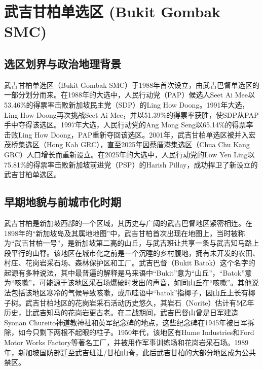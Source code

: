 \documentclass[11pt,a4paper,twoside,openany]{book}
\begin{document}
\chapter{武吉甘柏单选区 (Bukit Gombak SMC)}

\section{选区划界与政治地理背景}
武吉甘柏单选区（Bukit Gombak SMC）于1988年首次设立，由武吉巴督单选区的一部分划分而来。在1988年的大选中，人民行动党（PAP）候选人Seet Ai Mee以53.46\%的得票率击败新加坡民主党（SDP）的Ling How Doong。1991年大选，Ling How Doong再次挑战Seet Ai Mee，并以51.39\%的得票率获胜，使SDP从PAP手中夺得该选区。1997年大选，人民行动党的Ang Mong Seng以65.14\%的得票率击败Ling How Doong，PAP重新夺回该选区。2001年，武吉甘柏单选区被并入宏茂桥集选区（Hong Kah GRC），直至2025年因蔡厝港集选区（Chua Chu Kang GRC）人口增长而重新设立。在2025年的大选中，人民行动党的Low Yen Ling以75.81\%的得票率击败新加坡前进党（PSP）的Harish Pillay，成功捍卫了新设立的武吉甘柏单选区。

\section{早期地貌与前城市化时期}
武吉甘柏是新加坡西部的一个区域，其历史与广阔的武吉巴督地区紧密相连。在1898年的“新加坡岛及其属地地图”中，武吉甘柏首次出现在地图上，当时被称为“武吉甘柏一号”，是新加坡第二高的山丘，与武吉班让共享一条与武吉知马路上段平行的山脊。该地区在城市化之前是一个沉睡的乡村腹地，拥有未开发的农田、村庄、花岗岩采石场、森林保护区和工厂。武吉巴督（Bukit Batok）这个名字的起源有多种说法，其中最普遍的解释是马来语中“Bukit”意为“山丘”，“Batok”意为“咳嗽”，可能源于该地区采石场爆破时发出的声音，如同山丘在“咳嗽”。其他说法包括该地区寒冷的气候导致咳嗽，或爪哇语中“batok”指椰子，因山丘上长有椰子树。武吉甘柏地区的花岗岩采石活动历史悠久，其岩石（Norite）估计有5亿年历史，比武吉知马的花岗岩更古老。在二战期间，武吉巴督山曾是日军建造Syonan Chureito神道教神社和英军纪念碑的地点，这些纪念碑在1945年被日军拆除，如今只剩下两根不起眼的柱子。1950年代，该地区有Hume Industries和Ford Motor Works Factory等著名工厂，并被用作军事训练场和花岗岩采石场。1989年，新加坡国防部迁至武吉班让/甘柏山脊，此后武吉甘柏的大部分地区成为公共禁区。
\end{document}
